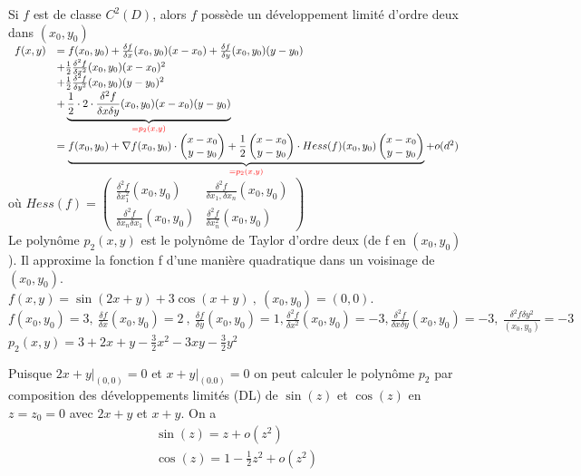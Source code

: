 \documentclass[12pt,a4paper]{article}
\begin{document}
Si $f$ est de classe $C^2(D)$, alors $f$ possède un développement limité d'ordre deux dans $(x_0,y_0)$\\
$\begin{array}{ll}
	f(x,y) &= f(x_0,y_0) + \frac{\delta f}{\delta x}(x_0,y_0)(x-x_0) + \frac{\delta f}{\delta y}(x_0,y_0)(y-y_0)\\
	& + \frac{1}{2}\frac{\delta^2 f}{\delta x^2}(x_0,y_0)(x-x_0)^2\\
	&+ \frac{1}{2}\frac{\delta^2 f}{\delta y^2}(x_0,y_0)(y-y_0)^2\\
	&+ \underbrace{\frac{1}{2}\cdot 2 \cdot \frac{\delta^2 f}{\delta x\delta y}(x_0,y_0)(x-x_0)(y-y_0)}_{\textcolor{red}{= p_2(x,y)}}\\
	& = \underbrace{f(x_0,y_0) + \nabla f(x_0,y_0) \cdot\begin{pmatrix} x-x_0 \\ y-y_0 \end{pmatrix} + \frac{1}{2} \begin{pmatrix} x-x_0 \\ y-y_0 \end{pmatrix} \cdot Hess(f)(x_0,y_0)\begin{pmatrix} x-x_0 \\ y-y_0 \end{pmatrix}}_{\textcolor{red}{= p_2(x,y)}} + o(d^2)
\end{array}$
où $Hess(f) = \begin{pmatrix}
			\frac{\delta^2 f}{\delta x_1^2 }(x_0,y_0) & \frac{\delta^2 f}{\delta x_1, \delta x_n}(x_0,y_0)\\
			\frac{\delta^2 f}{\delta x_n\delta x_1}(x_0,y_0) & \frac{\delta^2 f}{\delta x_n^2} (x_0,y_0)
	\end{pmatrix}$\\
Le polynôme $p_2(x,y)$ est le polynôme de Taylor d'ordre deux (de f en $(x_0,y_0)$). Il approxime la fonction f d'une manière quadratique dans un voisinage de $(x_0,y_0)$.\\
 $f(x,y) = \sin(2x + y) + 3\cos(x+y) \ , \ (x_0,y_0) = (0,0)$.\\
$f(x_0,y_0) = 3,\ \frac{\delta f}{\delta x}(x_0,y_0) = 2 \ , \ \frac{\delta f}{\delta y}(x_0,y_0) = 1, \frac{\delta^2 f}{\delta x^2}(x_0,y_0) = -3, \frac{\delta^2 f}{\delta x \delta y}(x_0,y_0) = -3, \ \frac{\delta^2 f\delta y^2}{(x_0,y_0)} = -3$\\
$p_2(x,y) = 3 + 2x + y - \frac{3}{2}x^2 - 3xy - \frac{3}{2}y^2$
\begin{center}
\end{center}
Puisque $2x + y|_{(0,0)} = 0$ et $x+y|_{(0.0)} = 0$ on peut calculer le polynôme $p_2$ par composition des développements limités (DL) de $\sin(z)$ et $\cos(z)$ en $z = z_0 = 0$ avec $2x + y$ et $x+y$. On a 
\begin{align*}
	\sin(z) = z + o(z^2)\\
	\cos(z) = 1 - \frac{1}{2}z^2 + o(z^2)
\end{align*}
\end{document}
